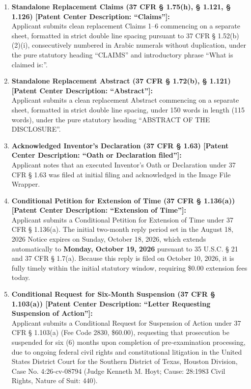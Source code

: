 \documentclass[11pt,letterpaper]{article}
\begin{document}
\begin{enumerate}[leftmargin=*]
    \item \textbf{Standalone Replacement Claims (37 CFR \S{} 1.75(h), \S{} 1.121, \S{} 1.126) [Patent Center Description: ``Claims'']:} \\
    Applicant submits clean replacement Claims 1--6 commencing on a separate sheet, formatted in strict double line spacing pursuant to 37 CFR \S{} 1.52(b)(2)(i), consecutively numbered in Arabic numerals without duplication, under the pure statutory heading ``CLAIMS'' and introductory phrase ``What is claimed is:''.

    \item \textbf{Standalone Replacement Abstract (37 CFR \S{} 1.72(b), \S{} 1.121) [Patent Center Description: ``Abstract'']:} \\
    Applicant submits a clean replacement Abstract commencing on a separate sheet, formatted in strict double line spacing, under 150 words in length (115 words), under the pure statutory heading ``ABSTRACT OF THE DISCLOSURE''.

    \item \textbf{Acknowledged Inventor's Declaration (37 CFR \S{} 1.63) [Patent Center Description: ``Oath or Declaration filed'']:} \\
    Applicant notes that an executed Inventor's Oath or Declaration under 37 CFR \S{} 1.63 was filed at initial filing and acknowledged in the Image File Wrapper.

    \item \textbf{Conditional Petition for Extension of Time (37 CFR \S{} 1.136(a)) [Patent Center Description: ``Extension of Time'']:} \\
    Applicant submits a Conditional Petition for Extension of Time under 37 CFR \S{} 1.136(a). The initial two-month reply period set in the August 18, 2026 Notice expires on Sunday, October 18, 2026, which extends automatically to \textbf{Monday, October 19, 2026} pursuant to 35 U.S.C. \S{} 21 and 37 CFR \S{} 1.7(a). Because this reply is filed on October 10, 2026, it is fully timely within the initial statutory window, requiring \$0.00 extension fees today.

    \item \textbf{Conditional Request for Six-Month Suspension (37 CFR \S{} 1.103(a)) [Patent Center Description: ``Letter Requesting Suspension of Action'']:} \\
    Applicant submits a Conditional Request for Suspension of Action under 37 CFR \S{} 1.103(a) (Fee Code 2830, \$60.00), requesting that prosecution be suspended for six (6) months upon completion of pre-examination processing, due to ongoing federal civil rights and constitutional litigation in the United States District Court for the Southern District of Texas, Houston Division, Case No. 4:26-cv-08794 (Judge Kenneth M. Hoyt; Cause: 28:1983 Civil Rights, Nature of Suit: 440).
\end{enumerate}
\end{document}
